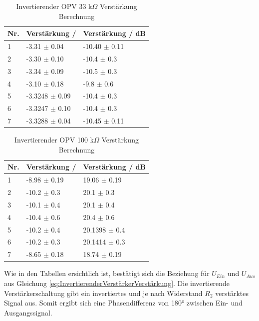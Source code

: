 \documentclass[12pt,a4paper,twoside]{article}
\begin{document}
\begin{table}[H]
    \centering
    \caption{Invertierender OPV 33 k$\Omega$ Verstärkung Berechnung}
    \label{tab:IoVerstärkungenBerechnet33}
    \begin{tabular}{| l | l | l |}
        \hline
        Nr. & Verstärkung / & Verstärkung / dB \\
        \hline
        1 & -3.31 $\pm$ 0.04 & -10.40 $\pm$ 0.11 \\
        2 & -3.30 $\pm$ 0.10 & -10.4 $\pm$ 0.3 \\
        3 & -3.34 $\pm$ 0.09 & -10.5 $\pm$ 0.3 \\
        4 & -3.10 $\pm$ 0.18 & -9.8 $\pm$ 0.6 \\
        5 & -3.3248 $\pm$ 0.09 & -10.4 $\pm$ 0.3 \\
        6 & -3.3247 $\pm$ 0.10 & -10.4 $\pm$ 0.3 \\
        7 & -3.3288 $\pm$ 0.04 & -10.45 $\pm$ 0.11 \\
        \hline
    \end{tabular}
\end{table}

\begin{table}[H]
    \centering
    \caption{Invertierender OPV 100 k$\Omega$ Verstärkung Berechnung}
    \label{tab:IoVerstärkungenBerechnet100}
    \begin{tabular}{| l | l | l |}
        \hline
        Nr. & Verstärkung / & Verstärkung / dB \\
        \hline
        1 & -8.98 $\pm$ 0.19 & 19.06 $\pm$ 0.19 \\
        2 & -10.2 $\pm$ 0.3 & 20.1 $\pm$ 0.3 \\
        3 & -10.1 $\pm$ 0.4 & 20.1 $\pm$ 0.4 \\
        4 & -10.4 $\pm$ 0.6 & 20.4 $\pm$ 0.6 \\
        5 & -10.2 $\pm$ 0.4 & 20.1398 $\pm$ 0.4 \\
        6 & -10.2 $\pm$ 0.3 & 20.1414 $\pm$ 0.3 \\
        7 & -8.65 $\pm$ 0.18 & 18.74 $\pm$ 0.19 \\
        \hline
    \end{tabular}
\end{table}

\noindent
Wie in den Tabellen ersichtlich ist, bestätigt sich die Beziehung für $U_{Ein}$ und $U_{Aus}$ aus Gleichung \ref{eq:InvertierenderVerstärkerVerstärkung}.
Die invertierende Verstärkerschaltung gibt ein invertiertes und je nach Widerstand $R_{2}$ verstärktes Signal aus. Somit ergibt sich eine Phasendifferenz von 180° zwischen Ein- und Ausgangssignal.
\end{document}
